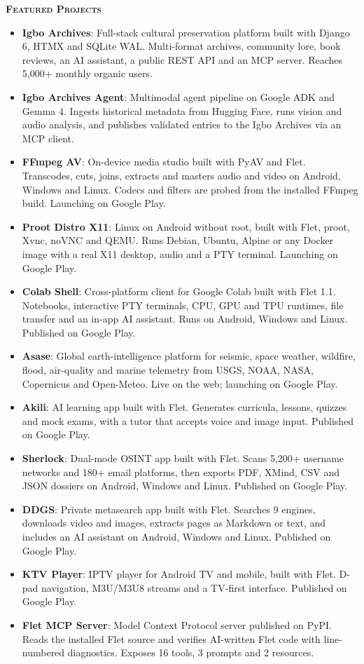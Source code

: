 \documentclass[10pt,letterpaper]{article}
\newcommand{\proj}[2]{\item \textbf{#1}: #2}
\newcommand{\subhead}[1]{\par\vspace{4pt}\noindent\textbf{\textsc{#1}}\par\vspace{1pt}}
\begin{document}
\subhead{Featured Projects}
\begin{itemize}
\proj{Igbo Archives}{Full-stack cultural preservation platform built with Django 6, HTMX and SQLite WAL. Multi-format archives, community lore, book reviews, an AI assistant, a public REST API and an MCP server. Reaches 5,000+ monthly organic users.}
\proj{Igbo Archives Agent}{Multimodal agent pipeline on Google ADK and Gemma 4. Ingests historical metadata from Hugging Face, runs vision and audio analysis, and publishes validated entries to the Igbo Archives via an MCP client.}
\proj{FFmpeg AV}{On-device media studio built with PyAV and Flet. Transcodes, cuts, joins, extracts and masters audio and video on Android, Windows and Linux. Codecs and filters are probed from the installed FFmpeg build. Launching on Google Play.}
\proj{Proot Distro X11}{Linux on Android without root, built with Flet, proot, Xvnc, noVNC and QEMU. Runs Debian, Ubuntu, Alpine or any Docker image with a real X11 desktop, audio and a PTY terminal. Launching on Google Play.}
\proj{Colab Shell}{Cross-platform client for Google Colab built with Flet 1.1. Notebooks, interactive PTY terminals, CPU, GPU and TPU runtimes, file transfer and an in-app AI assistant. Runs on Android, Windows and Linux. Published on Google Play.}
\proj{Asase}{Global earth-intelligence platform for seismic, space weather, wildfire, flood, air-quality and marine telemetry from USGS, NOAA, NASA, Copernicus and Open-Meteo. Live on the web; launching on Google Play.}
\proj{Akili}{AI learning app built with Flet. Generates curricula, lessons, quizzes and mock exams, with a tutor that accepts voice and image input. Published on Google Play.}
\proj{Sherlock}{Dual-mode OSINT app built with Flet. Scans 5,200+ username networks and 180+ email platforms, then exports PDF, XMind, CSV and JSON dossiers on Android, Windows and Linux. Published on Google Play.}
\proj{DDGS}{Private metasearch app built with Flet. Searches 9 engines, downloads video and images, extracts pages as Markdown or text, and includes an AI assistant on Android, Windows and Linux. Published on Google Play.}
\proj{KTV Player}{IPTV player for Android TV and mobile, built with Flet. D-pad navigation, M3U/M3U8 streams and a TV-first interface. Published on Google Play.}
\proj{Flet MCP Server}{Model Context Protocol server published on PyPI. Reads the installed Flet source and verifies AI-written Flet code with line-numbered diagnostics. Exposes 16 tools, 3 prompts and 2 resources.}
\end{itemize}
\end{document}
